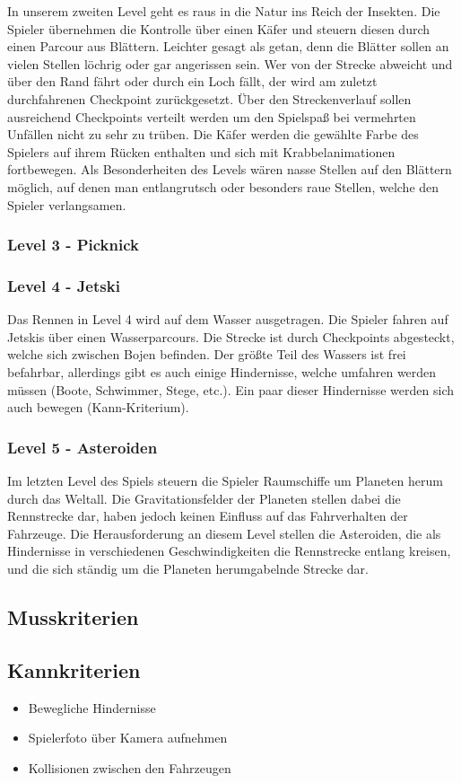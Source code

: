 In unserem zweiten Level geht es raus in die Natur ins Reich der Insekten. Die Spieler übernehmen die Kontrolle über einen Käfer und steuern diesen durch einen Parcour aus Blättern. Leichter gesagt als getan, denn die Blätter sollen an vielen Stellen löchrig oder gar angerissen sein. Wer von der Strecke abweicht und über den Rand fährt oder durch ein Loch fällt, der wird am zuletzt durchfahrenen Checkpoint zurückgesetzt. Über den Streckenverlauf sollen ausreichend Checkpoints verteilt werden um den Spielspaß bei vermehrten Unfällen nicht zu sehr zu trüben. Die Käfer werden die gewählte Farbe des Spielers auf ihrem Rücken enthalten und sich mit Krabbelanimationen fortbewegen. Als Besonderheiten des Levels wären nasse Stellen auf den Blättern möglich, auf denen man entlangrutsch oder besonders raue Stellen, welche den Spieler verlangsamen.

\subsubsection{Level 3 - Picknick}

\subsubsection{Level 4 - Jetski}

Das Rennen in Level 4 wird auf dem Wasser ausgetragen. Die Spieler fahren auf Jetskis über einen Wasserparcours. Die Strecke ist durch Checkpoints abgesteckt, welche sich zwischen Bojen befinden. Der größte Teil des Wassers ist frei befahrbar, allerdings gibt es auch einige Hindernisse, welche umfahren werden müssen (Boote, Schwimmer, Stege, etc.). Ein paar dieser Hindernisse werden sich auch bewegen (Kann-Kriterium).

\subsubsection{Level 5 - Asteroiden}

Im letzten Level des Spiels steuern die Spieler Raumschiffe um Planeten herum durch das Weltall. Die Gravitationsfelder der Planeten stellen dabei die Rennstrecke dar, haben jedoch keinen Einfluss auf das Fahrverhalten der Fahrzeuge. Die Herausforderung an diesem Level stellen die Asteroiden, die als Hindernisse in verschiedenen Geschwindigkeiten die Rennstrecke entlang kreisen, und die sich ständig um die Planeten herumgabelnde Strecke dar.

\subsection{Musskriterien}

\subsection{Kannkriterien}

\begin{itemize}
\item Bewegliche Hindernisse
\item Spielerfoto über Kamera aufnehmen
\item Kollisionen zwischen den Fahrzeugen
\end{itemize}

